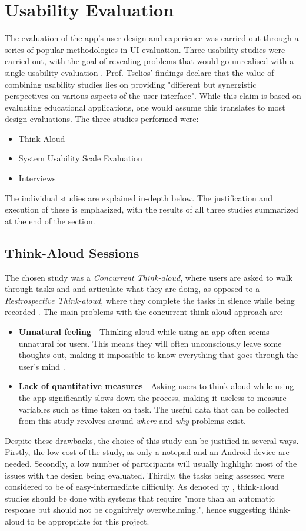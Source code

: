 \section{Usability Evaluation}
The evaluation of the app's user design and experience was carried out through a series of popular methodologies in UI evaluation. Three usability studies were carried out, with the goal of revealing problems that would go unrealised with a single usability evaluation \cite{article}. Prof. Tselios' findings declare that the value of combining usability studies lies on providing "different but synergistic perspectives on various aspects of the user interface". While this claim is based on evaluating educational applications, one would assume this translates to most design evaluations. The three studies performed were:
\begin{itemize}
    \item Think-Aloud
    \item System Usability Scale Evaluation
    \item Interviews
\end{itemize}
The individual studies are explained in-depth below. The justification and execution of these is emphasized, with the results of all three studies summarized at the end of the section.
\subsection{Think-Aloud Sessions}
The chosen study was a \emph{Concurrent Think-aloud}, where users are asked to walk through tasks and and articulate what they are doing, as opposed to a  \emph{Restrospective Think-aloud}, where they complete the tasks in silence while being recorded \cite{hanington2012universal}. The main problems with the concurrent think-aloud approach are:
\begin{itemize}
    \item \textbf{Unnatural feeling} - Thinking aloud while using an app often seems unnatural for users. This means they will often unconsciously leave some thoughts out, making it impossible to know everything that goes through the user's mind \cite{rubin1996handbook}.
    \item \textbf{Lack of quantitative measures} - Asking users to think aloud while using the app significantly slows down the process, making it useless to measure variables such as time taken on task. The useful data that can be collected from this study revolves around \emph{where} and \emph{why} problems exist.
\end{itemize}
Despite these drawbacks, the choice of this study can be justified in several ways. Firstly, the low cost of the study, as only a notepad and an Android device are needed. Secondly, a low number of participants will usually highlight most of the issues with the design being evaluated. Thirdly, the tasks being assessed were considered to be of easy-intermediate difficulty. As denoted by \cite{charters2003use}, think-aloud studies should be done with systems that require "more than an automatic response but should not be cognitively overwhelming.", hence suggesting think-aloud to be appropriate for this project.


